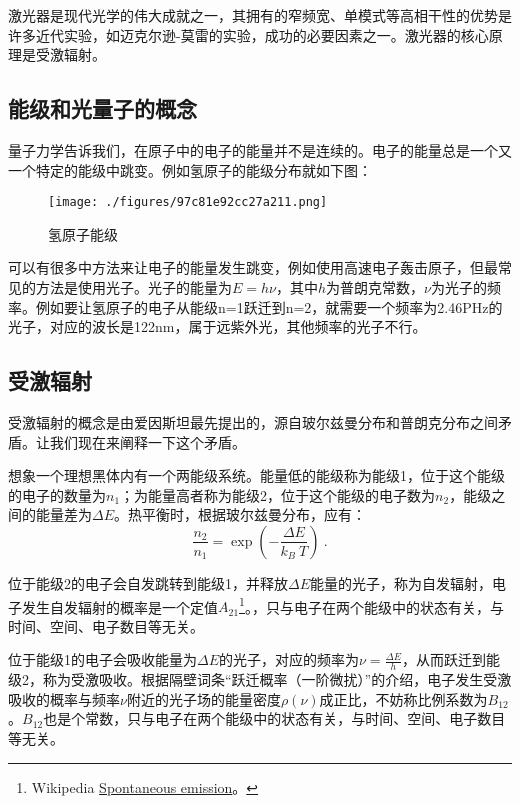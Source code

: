 

激光器是现代光学的伟大成就之一，其拥有的窄频宽、单模式等高相干性的优势是许多近代实验，如迈克尔逊-莫雷的实验，成功的必要因素之一。激光器的核心原理是受激辐射。

\subsection{能级和光量子的概念}
量子力学告诉我们，在原子中的电子的能量并不是连续的。电子的能量总是一个又一个特定的能级中跳变。例如氢原子的能级分布就如下图：\begin{figure}[ht]
\centering
\texttt{[image: ./figures/97c81e92cc27a211.png]}
\caption{氢原子能级} \label{fig_LaserT_1}
\end{figure}
可以有很多中方法来让电子的能量发生跳变，例如使用高速电子轰击原子，但最常见的方法是使用光子。光子的能量为$E=h\nu$，其中$h$为普朗克常数，$\nu$为光子的频率。例如要让氢原子的电子从能级n=1跃迁到n=2，就需要一个频率为2.46PHz的光子，对应的波长是122nm，属于远紫外光，其他频率的光子不行。
\subsection{受激辐射}
受激辐射的概念是由爱因斯坦最先提出的，源自玻尔兹曼分布和普朗克分布之间矛盾。让我们现在来阐释一下这个矛盾。

想象一个理想黑体内有一个两能级系统。能量低的能级称为能级1，位于这个能级的电子的数量为$n_1$；为能量高者称为能级2，位于这个能级的电子数为$n_2$，能级之间的能量差为$\Delta E$。热平衡时，根据玻尔兹曼分布，应有：
\begin{equation}
\frac{n_2}{n_1}=\exp(-\frac{\Delta E}{k_B \ T})~.
\end{equation}

位于能级2的电子会自发跳转到能级1，并释放$\Delta E$能量的光子，称为自发辐射，电子发生自发辐射的概率是一个定值$A_{21}$\footnote{ Wikipedia \href{https://en.wikipedia.org/wiki/Spontaneous_emission}{Spontaneous emission}。}。，只与电子在两个能级中的状态有关，与时间、空间、电子数目等无关。

位于能级1的电子会吸收能量为$\Delta E$的光子，对应的频率为$\nu=\frac{\Delta E}{h}$，从而跃迁到能级2，称为受激吸收。根据隔壁词条“跃迁概率（一阶微扰）”的介绍，电子发生受激吸收的概率与频率$\nu$附近的光子场的能量密度$\rho(\nu)$成正比，不妨称比例系数为$B_{12}$。$B_{12}$也是个常数，只与电子在两个能级中的状态有关，与时间、空间、电子数目等无关。

